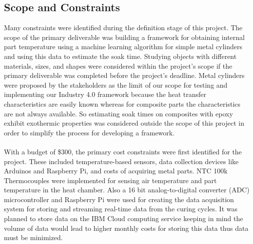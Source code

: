 \subsection{Scope and Constraints}%
Many constraints were identiﬁed during the definition stage of this project. The scope of the primary deliverable was building a framework for obtaining internal part temperature using a machine learning algorithm for simple metal cylinders and using this data to estimate the soak time. Studying objects with diﬀerent materials, sizes, and shapes were considered within the project’s scope if the primary deliverable was completed before the project’s deadline. Metal cylinders were proposed by the stakeholders as the limit of our scope for testing and implementing our Industry 4.0 framework because the heat transfer characteristics are easily known whereas for composite parts the characteristics are not always available. So estimating soak times on composites with epoxy exhibit exothermic properties was considered outside the scope of this project in order to simplify the process for developing a framework.
\\\\
With a budget of \$300, the primary cost constraints were first identified for the project. These included temperature-based sensors, data collection devices like Arduinos and Raspberry Pi, and costs of acquiring metal parts. NTC 100k Thermocouples were implemented for sensing air temperature and part temperature in the heat chamber. Also a 16 bit analog-to-digital converter (ADC) microcontroller and Raspberry Pi were used for creating the data acquisition system for storing and streaming real-time data from the curing cycles. It was planned to store data on the IBM Cloud computing service keeping in mind the volume of data would lead to higher monthly costs for storing this data thus data must be minimized.%
